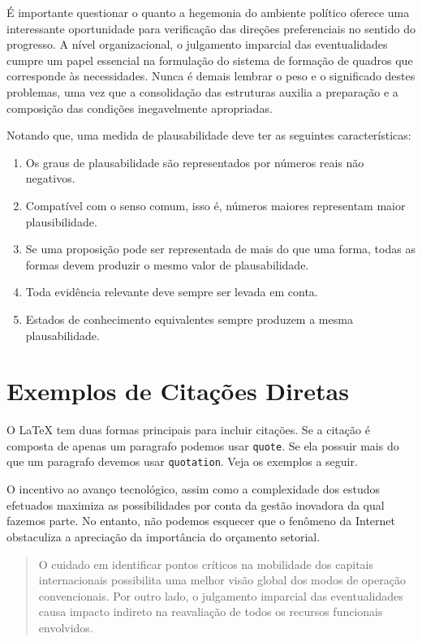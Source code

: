 \documentclass[fleqn]{icat-ufal}
\begin{document}
É importante questionar o quanto a hegemonia do ambiente político oferece uma
interessante oportunidade para verificação das direções preferenciais no sentido
do progresso. A nível organizacional, o julgamento imparcial das eventualidades
cumpre um papel essencial na formulação do sistema de formação de quadros que
corresponde às necessidades. Nunca é demais lembrar o peso e o significado
destes problemas, uma vez que a consolidação das estruturas auxilia a preparação
e a composição das condições inegavelmente apropriadas. 

Notando que, uma medida de plausabilidade deve ter as seguintes características:
\begin{enumerate}[label=\alph*)]
    \item Os graus de plausabilidade são representados por números reais não negativos.
    \item Compatível com o senso comum, isso é, números maiores representam maior plausibilidade.
    \item Se uma proposição pode ser representada de mais do que uma forma, 
    todas as formas devem produzir o mesmo valor de plausabilidade.
    \item Toda evidência relevante deve sempre ser levada em conta.
    \item Estados de conhecimento equivalentes sempre produzem a mesma plausabilidade.
\end{enumerate}

\section{Exemplos de Citações Diretas}
\label{sec:exemplos_citacoes}

O \LaTeX{} tem duas formas principais para incluir citações. Se a citação é 
composta de apenas um paragrafo podemos usar \lstinline{quote}. Se
ela possuir mais do que um paragrafo devemos usar \lstinline{quotation}.
Veja os exemplos a seguir.

O incentivo ao avanço tecnológico, assim como a complexidade dos estudos
efetuados maximiza as possibilidades por conta da gestão inovadora da qual
fazemos parte.
No entanto, não podemos esquecer que o fenômeno da Internet obstaculiza a
apreciação da importância do orçamento setorial. 

\begin{quote}
    O cuidado em identificar pontos críticos na mobilidade dos capitais
    internacionais possibilita uma melhor visão global dos modos de operação
    convencionais. Por outro lado, o julgamento imparcial das eventualidades causa
    impacto indireto na reavaliação de todos os recursos funcionais envolvidos.
\end{quote}
\end{document}

